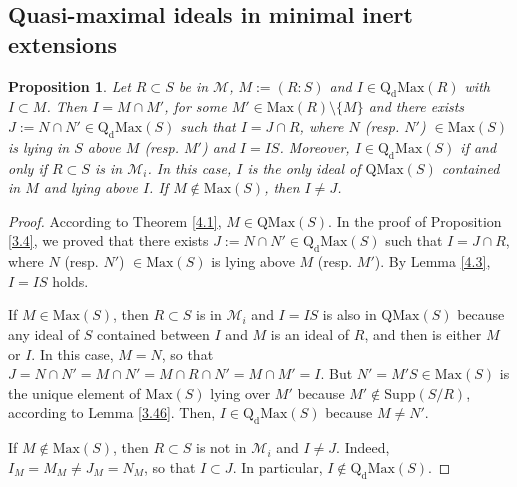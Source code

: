 \documentclass[12pt,leqno]{amsart}
\newtheorem{proposition}[theorem]{Proposition}
\theoremstyle{definition}
\begin{document}
\subsection{Quasi-maximal ideals in minimal inert  extensions}\begin{proposition}\label{4.5} Let $R\subset S$ be in $\mathcal M$, $M:= (R:S)$ and $I\in\mathrm{Q_dMax}(R)$ with $I\subset M$. Then  $I=M\cap M'$, for some $M'\in\mathrm{Max}(R)\setminus\{M\}$ and there exists $J:= N\cap N'\in\mathrm{Q_dMax}(S)$ such that $I=J\cap R$, where $N$ (resp. $N'$) $\in\mathrm{Max}(S)$ is lying in $S$ above $M$ (resp. $M'$) and $I =IS$. Moreover, $I\in\mathrm{Q_dMax}(S)$ if and only if $R\subset S$ is in $\mathcal M_i$. In this case, $I$ is the only ideal of $\mathrm{QMax}(S)$ contained in $M$ and lying above $I$. If $M\not\in\mathrm{Max}(S)$, then $I\neq J$. 
\end{proposition}
\begin{proof} 

According to Theorem \ref{4.1}, $M\in\mathrm{QMax}(S)$. In the proof of Proposition \ref{3.4}, we proved that there exists $J:= N\cap N'\in\mathrm {Q_dMax}(S)$ such that $I=J\cap R$, where $N$ (resp. $N'$) $\in\mathrm {Max}(S)$ is lying above $M$ (resp. $M'$). By Lemma \ref{4.3}, $I=IS$ holds.  

If $M\in\mathrm{Max}(S)$, then $R\subset S$ is in $\mathcal M_i$
and $I=IS$ is also in $\mathrm{QMax}(S)$ because any ideal of $S$ contained between $I$ and $M$ is an ideal of $R$, and then is either $M$ or $I$. In this case, $M=N$, so that $J=N\cap N'=M\cap N'=M\cap R\cap N' =M\cap M'=I$. But $N'=M'S\in\mathrm{Max}(S)$ is the unique element of $\mathrm{Max}(S)$ lying over $M'$ because $M'\not\in\mathrm{Supp}(S/R)$, according to Lemma \ref{3.46}. Then, $I\in\mathrm{Q_dMax}(S)$ 
 because $M\neq N'$.

If $M\not\in\mathrm{Max}(S)$, then $R\subset S$ is not in $\mathcal M_i$
and $I\neq J$. Indeed, $I_M=M_M\neq J_M=N_M$, so that $I\subset J$. In particular, $I\not\in\mathrm{Q_dMax}(S)$. 
\end{proof} 
\end{document}

